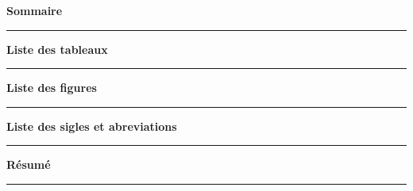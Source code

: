 \documentclass[12pt]{article}
\begin{document}
	
	\newpage
	
	\begin{flushright} %
		\textbf{\Large Sommaire}
		
		\rule{0.8\linewidth}{0.4pt} %
		\vspace{0.5cm}
		
	\end{flushright}
	
	\newpage
	
		\begin{flushright} %
		\textbf{\Large Liste des tableaux}
		
		\rule{0.8\linewidth}{0.4pt} %
		\vspace{0.5cm}
		
	\end{flushright}
	
	\newpage
	
		\begin{flushright} %
		\textbf{\Large Liste des figures}
		
		\rule{0.8\linewidth}{0.4pt} %
		\vspace{0.5cm}
		
	\end{flushright}
	
	\newpage
	
	\begin{flushright} %
		\textbf{\Large Liste des sigles et abreviations}
		
		\rule{0.8\linewidth}{0.4pt} %
		\vspace{0.5cm}
		
	\end{flushright}
	
	\newpage
	
	\begin{flushright} %
		\textbf{\Large Résumé}
		
		\rule{0.8\linewidth}{0.4pt} %
		\vspace{0.5cm}
		
	\end{flushright}
	
\end{document}
